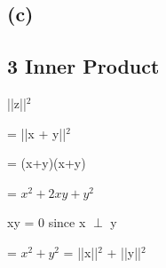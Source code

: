 \documentclass[11pt]{article}
\begin{document}
\subsection*{(c)}







\vspace{5mm}



\subsection*{3 Inner Product}
\begin{center}

||z||$^2$

\end{center}
\begin{center}

= ||x + y||$^2$

\end{center}
\begin{center}

= (x+y)(x+y)

\end{center}

\begin{center}

= $x^2 + 2xy + y^2$

\end{center}

\begin{center}

xy = 0 since x $\perp$ y

\end{center}

\begin{center}

= $x^2 + y^2$ = ||x||$^2$ + ||y||$^2$

\end{center}
\end{document}
